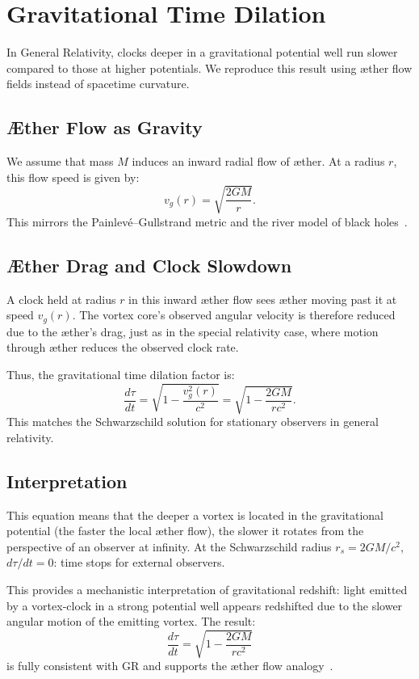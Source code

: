 
\section{Gravitational Time Dilation}

In General Relativity, clocks deeper in a gravitational potential well run slower compared to those at higher potentials. We reproduce this result using æther flow fields instead of spacetime curvature.

\subsection*{Æther Flow as Gravity}

We assume that mass $M$ induces an inward radial flow of æther. At a radius $r$, this flow speed is given by:
\[
v_g(r) = \sqrt{\frac{2GM}{r}}.
\]
This mirrors the Painlevé–Gullstrand metric and the river model of black holes~\cite{Hamilton2004-river}.

\subsection*{Æther Drag and Clock Slowdown}

A clock held at radius $r$ in this inward æther flow sees æther moving past it at speed $v_g(r)$. The vortex core's observed angular velocity is therefore reduced due to the æther's drag, just as in the special relativity case, where motion through æther reduces the observed clock rate.

Thus, the gravitational time dilation factor is:
\[
\frac{d\tau}{dt} = \sqrt{1 - \frac{v_g^2(r)}{c^2}} = \sqrt{1 - \frac{2GM}{rc^2}}. \tag{4}
\]
This matches the Schwarzschild solution for stationary observers in general relativity.

\subsection*{Interpretation}

This equation means that the deeper a vortex is located in the gravitational potential (the faster the local æther flow), the slower it rotates from the perspective of an observer at infinity. At the Schwarzschild radius $r_s = 2GM/c^2$, $d\tau/dt = 0$: time stops for external observers.

This provides a mechanistic interpretation of gravitational redshift: light emitted by a vortex-clock in a strong potential well appears redshifted due to the slower angular motion of the emitting vortex. The result:
\[
\boxed{\frac{d\tau}{dt} = \sqrt{1 - \frac{2GM}{rc^2}}}
\]
is fully consistent with GR and supports the æther flow analogy~\cite{Schiller2022-maxforce}.
